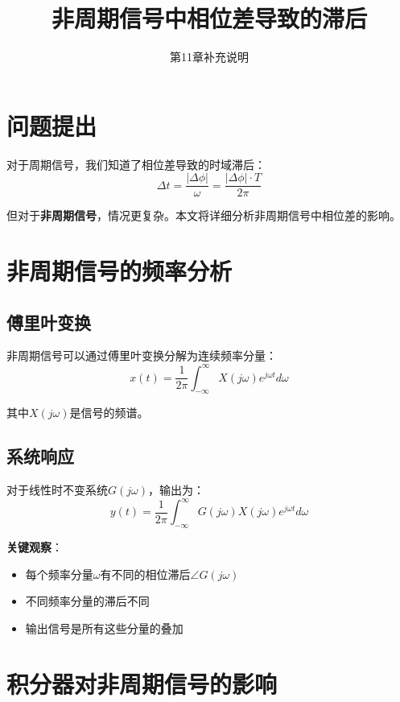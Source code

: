 \documentclass[12pt,a4paper]{article}
\title{非周期信号中相位差导致的滞后}
\author{第11章补充说明}
\date{}
\begin{document}
\maketitle

\section{问题提出}

对于周期信号，我们知道了相位差导致的时域滞后：
\begin{equation}
\Delta t = \frac{|\Delta \phi|}{\omega} = \frac{|\Delta \phi| \cdot T}{2\pi}
\end{equation}

但对于\textbf{非周期信号}，情况更复杂。本文将详细分析非周期信号中相位差的影响。

\section{非周期信号的频率分析}

\subsection{傅里叶变换}

非周期信号可以通过傅里叶变换分解为连续频率分量：
\begin{equation}
x(t) = \frac{1}{2\pi} \int_{-\infty}^{\infty} X(j\omega) e^{j\omega t} d\omega
\end{equation}

其中$X(j\omega)$是信号的频谱。

\subsection{系统响应}

对于线性时不变系统$G(j\omega)$，输出为：
\begin{equation}
y(t) = \frac{1}{2\pi} \int_{-\infty}^{\infty} G(j\omega) X(j\omega) e^{j\omega t} d\omega
\end{equation}

\textbf{关键观察}：
\begin{itemize}
\item 每个频率分量$\omega$有不同的相位滞后$\angle G(j\omega)$
\item 不同频率分量的滞后不同
\item 输出信号是所有这些分量的叠加
\end{itemize}

\section{积分器对非周期信号的影响}
\end{document}
